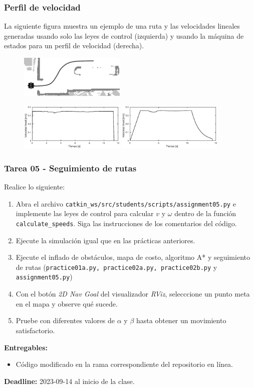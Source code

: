\begin{frame}\frametitle{Perfil de velocidad}
  La siguiente figura muestra un ejemplo de una ruta y las velocidades lineales generadas usando solo las leyes de control (izquierda) y usando la máquina de estados para un perfil de velocidad (derecha). 
  \begin{figure}
    \centering
    \includegraphics[width=0.45\textwidth]{Figures/SpeedProfilePath.png}
  \end{figure}
  \begin{figure}
    \centering
    \includegraphics[width=0.45\textwidth]{Figures/SpeedWithoutProfile.eps}
    \includegraphics[width=0.45\textwidth]{Figures/SpeedWithProfile.eps}
  \end{figure}
\end{frame}

\begin{frame}[containsverbatim]\frametitle{Tarea 05 - Seguimiento de rutas}
Realice lo siguiente:
  \begin{enumerate}
  \item Abra el archivo \texttt{catkin\_ws/src/students/scripts/assignment05.py} e implemente las leyes de control para calcular $v$ y $\omega$ dentro de la función \texttt{calculate\_speeds}. Siga las instrucciones de los comentarios del código. 
  \item Ejecute la simulación igual que en las prácticas anteriores. 
  \item Ejecute el inflado de obstáculos, mapa de costo, algoritmo A* y seguimiento de rutas (\texttt{practice01a.py, practice02a.py, practice02b.py} y \texttt{assignment05.py})
  \item Con el botón \textit{2D Nav Goal} del visualizador \textit{RViz}, selecccione un punto meta en el mapa y observe qué sucede. 
  \item Pruebe con diferentes valores de $\alpha$ y $\beta$ hasta obtener un movimiento satisfactorio. 
  \end{enumerate}
\[\]
  \textbf{Entregables:}
  \begin{itemize}
  \item Código modificado en la rama correspondiente del repositorio en línea.
  \end{itemize}
  \textbf{Deadline: } 2023-09-14 al inicio de la clase. 
\end{frame}


